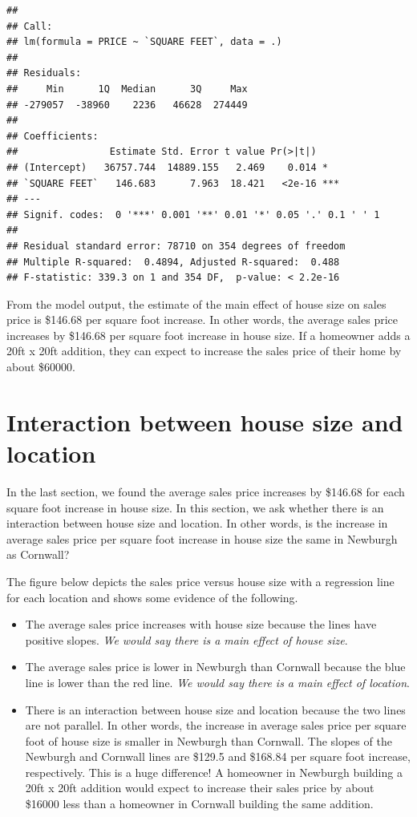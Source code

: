 \documentclass[]{book}
\begin{document}
\begin{verbatim}
## 
## Call:
## lm(formula = PRICE ~ `SQUARE FEET`, data = .)
## 
## Residuals:
##     Min      1Q  Median      3Q     Max 
## -279057  -38960    2236   46628  274449 
## 
## Coefficients:
##                Estimate Std. Error t value Pr(>|t|)    
## (Intercept)   36757.744  14889.155   2.469    0.014 *  
## `SQUARE FEET`   146.683      7.963  18.421   <2e-16 ***
## ---
## Signif. codes:  0 '***' 0.001 '**' 0.01 '*' 0.05 '.' 0.1 ' ' 1
## 
## Residual standard error: 78710 on 354 degrees of freedom
## Multiple R-squared:  0.4894, Adjusted R-squared:  0.488 
## F-statistic: 339.3 on 1 and 354 DF,  p-value: < 2.2e-16
\end{verbatim}

From the model output, the estimate of the main effect of house size on sales price is \$146.68 per square foot increase. In other words, the average sales price increases by \$146.68 per square foot increase in house size. If a homeowner adds a 20ft x 20ft addition, they can expect to increase the sales price of their home by about \$60000.

\hypertarget{interaction-between-house-size-and-location}{%
\section{Interaction between house size and location}\label{interaction-between-house-size-and-location}}

In the last section, we found the average sales price increases by \$146.68 for each square foot increase in house size. In this section, we ask whether there is an interaction between house size and location. In other words, is the increase in average sales price per square foot increase in house size the same in Newburgh as Cornwall?

The figure below depicts the sales price versus house size with a regression line for each location and shows some evidence of the following.

\begin{itemize}
\item
  The average sales price increases with house size because the lines have positive slopes. \emph{We would say there is a main effect of house size}.
\item
  The average sales price is lower in Newburgh than Cornwall because the blue line is lower than the red line. \emph{We would say there is a main effect of location}.
\item
  There is an interaction between house size and location because the two lines are not parallel. In other words, the increase in average sales price per square foot of house size is smaller in Newburgh than Cornwall. The slopes of the Newburgh and Cornwall lines are \$129.5 and \$168.84 per square foot increase, respectively. This is a huge difference! A homeowner in Newburgh building a 20ft x 20ft addition would expect to increase their sales price by about \$16000 less than a homeowner in Cornwall building the same addition.
\end{itemize}
\end{document}
